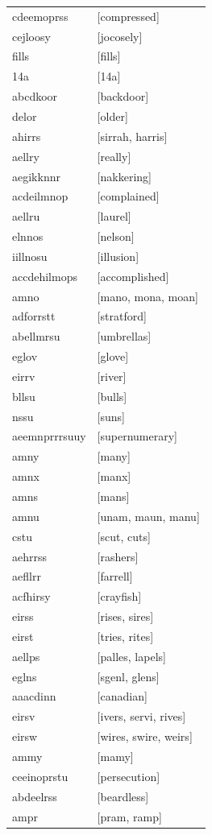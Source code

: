 \documentclass{article}
\begin{document}
\begin{tabular}{ll}
cdeemoprss & [compressed] \\
cejloosy & [jocosely] \\
fills & [fills] \\
14a & [14a] \\
abcdkoor & [backdoor] \\
delor & [older] \\
ahirrs & [sirrah, harris] \\
aellry & [really] \\
aegikknnr & [nakkering] \\
acdeilmnop & [complained] \\
aellru & [laurel] \\
elnnos & [nelson] \\
iillnosu & [illusion] \\
accdehilmops & [accomplished] \\
amno & [mano, mona, moan] \\
adforrstt & [stratford] \\
abellmrsu & [umbrellas] \\
eglov & [glove] \\
eirrv & [river] \\
bllsu & [bulls] \\
nssu & [suns] \\
aeemnprrrsuuy & [supernumerary] \\
amny & [many] \\
amnx & [manx] \\
amns & [mans] \\
amnu & [unam, maun, manu] \\
cstu & [scut, cuts] \\
aehrrss & [rashers] \\
aefllrr & [farrell] \\
acfhirsy & [crayfish] \\
eirss & [rises, sires] \\
eirst & [tries, rites] \\
aellps & [palles, lapels] \\
eglns & [sgenl, glens] \\
aaacdinn & [canadian] \\
eirsv & [ivers, servi, rives] \\
eirsw & [wires, swire, weirs] \\
ammy & [mamy] \\
ceeinoprstu & [persecution] \\
abdeelrss & [beardless] \\
ampr & [pram, ramp] \\

\end{tabular}
\end{document}
